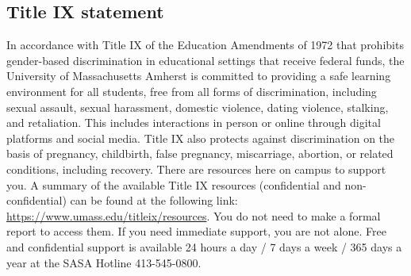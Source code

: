 \documentclass[11pt]{article}
\begin{document}
\subsection*{Title IX statement}
\label{sec:orge8301ab}
In accordance with Title IX of the Education Amendments of 1972 that prohibits
gender-based discrimination in educational settings that receive federal funds,
the University of Massachusetts Amherst is committed to providing a safe
learning environment for all students, free from all forms of discrimination,
including sexual assault, sexual harassment, domestic violence, dating
violence, stalking, and retaliation. This includes interactions in person or
online through digital platforms and social media. Title IX also protects
against discrimination on the basis of pregnancy, childbirth, false pregnancy,
miscarriage, abortion, or related conditions, including recovery. There are
resources here on campus to support you. A summary of the available Title IX
resources (confidential and non-confidential) can be found at the following
link: \url{https://www.umass.edu/titleix/resources}. You do not need to make a formal
report to access them. If you need immediate support, you are not alone. Free
and confidential support is available 24 hours a day / 7 days a week / 365 days
a year at the SASA Hotline 413-545-0800.
\end{document}
